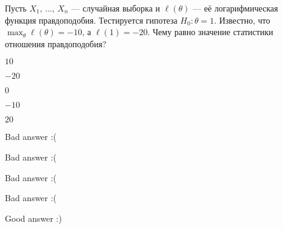 
\begin{question}
Пусть \(X_1, \, \ldots, \, X_n\) --- случайная выборка и
\(\ell(\theta)\) --- её логарифмическая функция правдоподобия.
Тестируется гипотеза \(H_0: \theta = 1\). Известно, что
\(\max_{\theta}\ell(\theta) = -10\), а \(\ell(1) = -20\). Чему равно
значение статистики отношения правдоподобия?
\begin{answerlist}
  \item \(10\)
  \item \(-20\)
  \item \(0\)
  \item \(-10\)
  \item \(20\)
\end{answerlist}
\end{question}

\begin{solution}
\begin{answerlist}
  \item Bad answer :(
  \item Bad answer :(
  \item Bad answer :(
  \item Bad answer :(
  \item Good answer :)
\end{answerlist}
\end{solution}


